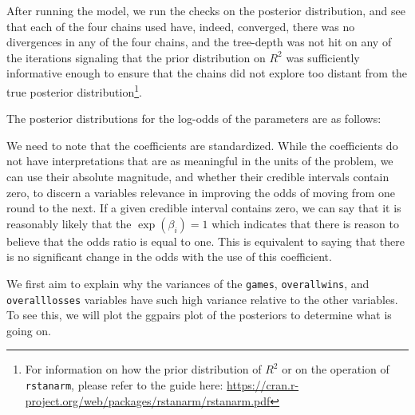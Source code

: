 \documentclass[10pt,a4paper, hidelinks]{article} %
\begin{document}
After running the model, we run the checks on the posterior distribution, and see that each of the four chains used have, indeed, converged, there was no divergences in any of the four chains, and the tree-depth was not hit on any of the iterations signaling that the prior distribution on $R^2$ was sufficiently informative enough to ensure that the chains did not explore too distant from the true posterior distribution\footnote{For information on how the prior distribution of $R^2$ or on the operation of \texttt{rstanarm}, please refer to the guide here: {\color{blue} \url{https://cran.r-project.org/web/packages/rstanarm/rstanarm.pdf}}}. 

The posterior distributions for the log-odds of the parameters are as follows:

\begin{figure}[H]
	\centering
	
\end{figure}




We need to note that the coefficients are standardized. While the coefficients do not have interpretations that are as meaningful in the units of the problem,  we can use their absolute magnitude, and whether their credible intervals contain zero, to discern a variables relevance in improving the odds of moving from one round to the next. If a given credible interval contains zero, we can say that it is reasonably likely that the $\exp(\beta_i) = 1$ which indicates that there is reason to believe that the odds ratio is equal to one. This is equivalent to saying that there is no significant change in the odds with the use of this coefficient. 

We first aim to explain why the variances of the \texttt{games}, \texttt{overallwins}, and \texttt{overalllosses} variables have such high variance relative to the other variables. To see this, we will plot the ggpairs plot of the posteriors to determine what is going on.
\end{document}
